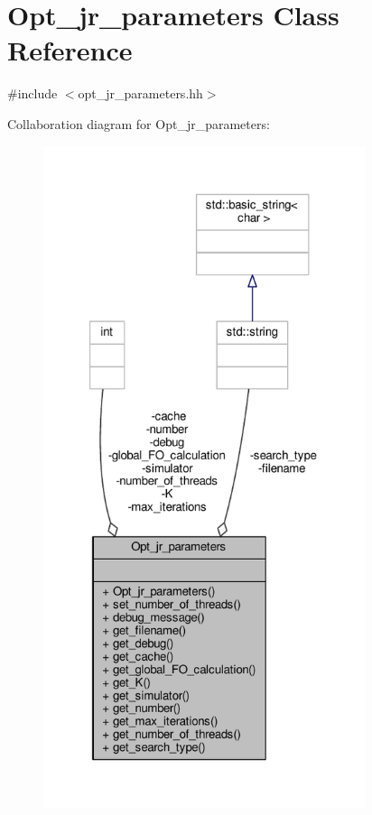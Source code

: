 \hypertarget{classOpt__jr__parameters}{\section{Opt\-\_\-jr\-\_\-parameters Class Reference}
\label{classOpt__jr__parameters}
}


{\ttfamily \#include $<$opt\-\_\-jr\-\_\-parameters.\-hh$>$}



Collaboration diagram for Opt\-\_\-jr\-\_\-parameters\-:
\nopagebreak
\begin{figure}[H]
\begin{center}
\leavevmode
\includegraphics[height=550pt]{classOpt__jr__parameters__coll__graph}
\end{center}
\end{figure}
